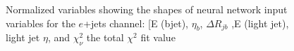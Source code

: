 \begin{figure}[h!]
\vspace{-4.5mm}
\hfil
{}
\caption{Normalized variables showing the shapes of neural network input variables for the $e$+jets channel: [E (bjet), $\eta_b$, $\Delta R_{jb}$ ,E (light jet), light jet $\eta$, and $\chi^2_\nu$ the total $\chi^2$ fit value  }
\label{fig:VarPlotsej4}
\end{figure}


